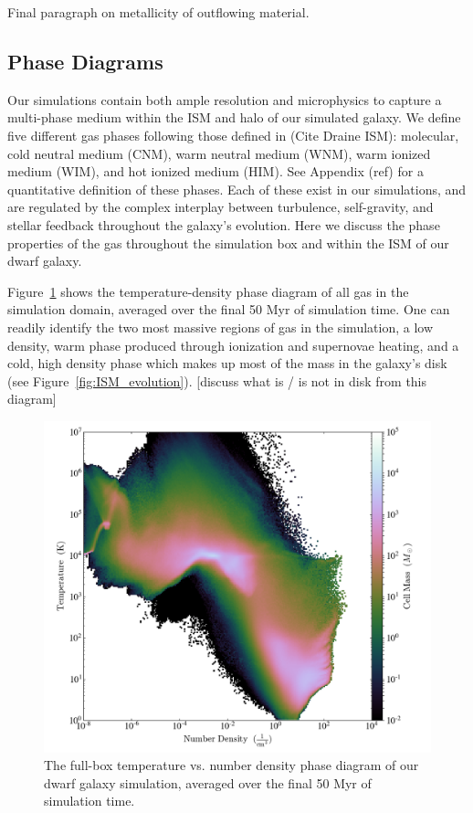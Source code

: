 \documentclass[twocolumn]{aastex61}
\begin{document}
Final paragraph on metallicity of outflowing material.

\subsection{Phase Diagrams}
\label{sec:phase}

Our simulations contain both ample resolution and microphysics to capture a multi-phase medium within the ISM and halo of our simulated galaxy. We define five different gas phases following those defined in (Cite Draine ISM): molecular, cold neutral medium (CNM), warm neutral medium (WNM), warm ionized medium (WIM), and hot ionized medium (HIM). See Appendix (ref) for a quantitative definition of these phases. Each of these exist in our simulations, and are regulated by the complex interplay between turbulence, self-gravity, and stellar feedback throughout the galaxy's evolution. Here we discuss the phase properties of the gas throughout the simulation box and within the ISM of our dwarf galaxy.

Figure~\ref{fig:phase} shows the temperature-density phase diagram of all gas in the simulation domain, averaged over the final 50 Myr of simulation time. One can readily identify the two most massive regions of gas in the simulation, a low density, warm phase produced through ionization and supernovae heating, and a cold, high density phase which makes up most of the mass in the galaxy's disk (see Figure~\ref{fig:ISM_evolution}). [discuss what is / is not in disk from this diagram]

\begin{figure}
\centering
\includegraphics[width=0.95\linewidth]{phase_diagram.png}
\caption{The full-box temperature vs. number density phase diagram of our dwarf galaxy simulation, averaged over the final 50 Myr of simulation time.}
\label{fig:phase}
\end{figure}
\end{document}
